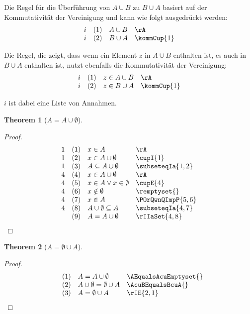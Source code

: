 \documentclass{book}
\theoremstyle{plain}
\newtheorem{theorem}{Theorem}
\theoremstyle{remark}
\theoremstyle{definition}
\begin{document}
Die Regel für die Überführung von \(A \cup B\) zu \(B \cup A\) basiert auf der Kommutativität der Vereinigung und kann wie folgt ausgedrückt werden:
\[
\begin{array}{llll}
	i & (1) & A \cup B & \rA \\
	i & (2) & B \cup A & \kommCup{1} \\
\end{array}
\]

Die Regel, die zeigt, dass wenn ein Element \(z\) in \(A \cup B\) enthalten ist, es auch in \(B \cup A\) enthalten ist, nutzt ebenfalls die Kommutativität der Vereinigung:
\[
\begin{array}{llll}
	i & (1) & z \in A \cup B & \rA \\
	i & (2) & z \in B \cup A & \kommCup{1} \\
\end{array}
\]

\(i\) ist dabei eine Liste von Annahmen. 


\label{AEqualsAcuEmptyset}
\begin{theorem}[\(A=A\cup\emptyset\)]
\end{theorem}	
\begin{proof}
	\[
	\begin{array}{llll}
		1 & (1) & x\in A & \rA \\
		  1 & (2) & x\in A\cup\emptyset & \cupI{1} \\
        1 & (3) & A\subseteq A\cup\emptyset & \subseteqIa{1,2} \\
    	4 & (4) & x\in A\cup\emptyset & \rA \\
        4 & (5) & x\in A\lor x\in\emptyset & \cupE{4} \\
        4 & (6) & x\notin \emptyset & \remptyset{} \\
        4 & (7) & x\in A & \POrQwnQImpP{5,6} \\
        4 & (8) & A\cup\emptyset\subseteq A & \subseteqIa{4,7} \\        
          & (9) & A=A\cup\emptyset & \rIIaSet{4,8} \\        
	\end{array}
	\]
\end{proof}

\label{AEqualsEmptysetcuA}
\begin{theorem}[\(A=\emptyset\cup A\)]
\end{theorem}
\begin{proof}
	\[
	\begin{array}{llll}
		   & (1) & A=A\cup\emptyset & \AEqualsAcuEmptyset{} \\
          & (2) & A\cup\emptyset = \emptyset\cup A & \AcuBEqualsBcuA{} \\
          & (3) & A = \emptyset\cup A & \rIE{2,1} \\
  
	\end{array}
	\]
\end{proof}
\end{document}
